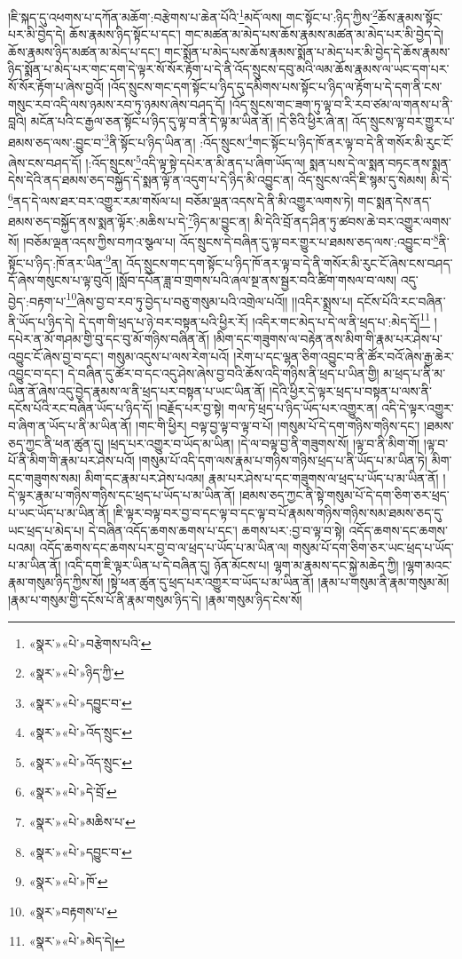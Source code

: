 །ཇི་སྐད་དུ་འཕགས་པ་དཀོན་མཆོག་:བརྩེགས་པ་ཆེན་པོའི་\footnote{«སྣར་»«པེ་»བརྩེགས་པའི་}མདོ་ལས། གང་སྟོང་པ་:ཉིད་ཀྱིས་\footnote{«སྣར་»«པེ་»ཉིད་ཀྱི་}ཆོས་རྣམས་སྟོང་པར་མི་བྱེད་དེ། ཆོས་རྣམས་ཉིད་སྟོང་པ་དང་། གང་མཚན་མ་མེད་པས་ཆོས་རྣམས་མཚན་མ་མེད་པར་མི་བྱེད་དེ། ཆོས་རྣམས་ཉིད་མཚན་མ་མེད་པ་དང་། གང་སྨོན་པ་མེད་པས་ཆོས་རྣམས་སྨོན་པ་མེད་པར་མི་བྱེད་དེ་ཆོས་རྣམས་ཉིད་སྨོན་པ་མེད་པར་གང་དག་དེ་ལྟར་སོ་སོར་རྟོག་པ་དེ་ནི་འོད་སྲུངས་དབུ་མའི་ལམ་ཆོས་རྣམས་ལ་ཡང་དག་པར་སོ་སོར་རྟོག་པ་ཞེས་བྱའོ། །འོད་སྲུངས་གང་དག་སྟོང་པ་ཉིད་དུ་དམིགས་པས་སྟོང་པ་ཉིད་ལ་རྟོག་པ་དེ་དག་ནི་ངས་གསུང་རབ་འདི་ལས་ཉམས་རབ་ཏུ་ཉམས་ཞེས་བཤད་དོ། །འོད་སྲུངས་གང་ཟག་ཏུ་ལྟ་བ་རི་རབ་ཙམ་ལ་གནས་པ་ནི་བླའི། མངོན་པའི་ང་རྒྱལ་ཅན་སྟོང་པ་ཉིད་དུ་ལྟ་བ་ནི་དེ་ལྟ་མ་ཡིན་ནོ། །དེ་ཅིའི་ཕྱིར་ཞེ་ན། འོད་སྲུངས་ལྟ་བར་གྱུར་པ་ཐམས་ཅད་ལས་:བྱུང་བ་\footnote{«སྣར་»«པེ་»དབྱུང་བ་}ནི་སྟོང་པ་ཉིད་ཡིན་ན། :འོད་སྲུངས་\footnote{«སྣར་»«པེ་»འོད་སྲུང་}གང་སྟོང་པ་ཉིད་ཁོ་ནར་ལྟ་བ་དེ་ནི་གསོར་མི་རུང་ངོ་ཞེས་ངས་བཤད་དོ། །:འོད་སྲུངས་\footnote{«སྣར་»«པེ་»འོད་སྲུང་}འདི་ལྟ་སྟེ་དཔེར་ན་མི་ནད་པ་ཞིག་ཡོད་ལ། སྨན་པས་དེ་ལ་སྨན་བཏང་ནས་སྨན་དེས་དེའི་ནད་ཐམས་ཅད་བསྐྱོད་དེ་སྨན་ལྟོ་ན་འདུག་པ་དེ་ཉིད་མི་འབྱུང་ན། འོད་སྲུངས་འདི་ཇི་སྙམ་དུ་སེམས། མི་དེ་\footnote{«སྣར་»«པེ་»དེ་བྲོ་}ནད་དེ་ལས་ཐར་བར་འགྱུར་རམ་གསོལ་པ། བཅོམ་ལྡན་འདས་དེ་ནི་མི་འགྱུར་ལགས་ཏེ། གང་སྨན་དེས་ནད་ཐམས་ཅད་བསྐྱོད་ནས་སྨན་ལྟོར་:མཆིས་པ་དེ་\footnote{«སྣར་»«པེ་»མཆིས་པ་}ཉིད་མ་བྱུང་ན། མི་དེའི་བྲོ་ནད་ཤིན་ཏུ་ཚབས་ཆེ་བར་འགྱུར་ལགས་སོ། །བཅོམ་ལྡན་འདས་ཀྱིས་བཀའ་སྩལ་པ། འོད་སྲུངས་དེ་བཞིན་དུ་ལྟ་བར་གྱུར་པ་ཐམས་ཅད་ལས་:འབྱུང་བ་\footnote{«སྣར་»«པེ་»དབྱུང་བ་}ནི་སྟོང་པ་ཉིད་:ཁོ་ནར་ཡིན་\footnote{«སྣར་»«པེ་»ཁོ་}ན། འོད་སྲུངས་གང་དག་སྟོང་པ་ཉིད་ཁོ་ནར་ལྟ་བ་དེ་ནི་གསོར་མི་རུང་ངོ་ཞེས་ངས་བཤད་དོ་ཞེས་གསུངས་པ་ལྟ་བུའོ། །སློབ་དཔོན་ཟླ་བ་གྲགས་པའི་ཞལ་སྔ་ནས་སྦྱར་བའི་ཚིག་གསལ་བ་ལས། འདུ་བྱེད་:བརྟག་པ་\footnote{«སྣར་»བརྟགས་པ་}ཞེས་བྱ་བ་རབ་ཏུ་བྱེད་པ་བཅུ་གསུམ་པའི་འགྲེལ་པའོ།། །།འདིར་སྨྲས་པ། དངོས་པོའི་རང་བཞིན་ནི་ཡོད་པ་ཉིད་དེ། དེ་དག་གི་ཕྲད་པ་ཉེ་བར་བསྟན་པའི་ཕྱིར་རོ། །འདིར་གང་མེད་པ་དེ་ལ་ནི་ཕྲད་པ་:མེད་དོ།\footnote{«སྣར་»«པེ་»མེད་དེ།} །དཔེར་ན་མོ་གཤམ་གྱི་བུ་དང་བུ་མོ་གཉིས་བཞིན་ནོ། །མིག་དང་གཟུགས་ལ་བརྟེན་ནས་མིག་གི་རྣམ་པར་ཤེས་པ་འབྱུང་ངོ་ཞེས་བྱ་བ་དང་། གསུམ་འདུས་པ་ལས་རེག་པའོ། །རེག་པ་དང་ལྷན་ཅིག་འབྱུང་བ་ནི་ཚོར་བའོ་ཞེས་རྒྱ་ཆེར་འབྱུང་བ་དང་། དེ་བཞིན་དུ་ཚོར་བ་དང་འདུ་ཤེས་ཞེས་བྱ་བའི་ཆོས་འདི་གཉིས་ནི་ཕྲད་པ་ཡིན་གྱི། མ་ཕྲད་པ་ནི་མ་ཡིན་ནོ་ཞེས་འདུ་བྱེད་རྣམས་ལ་ནི་ཕྲད་པར་བསྟན་པ་ཡང་ཡིན་ནོ། །དེའི་ཕྱིར་དེ་ལྟར་ཕྲད་པ་བསྟན་པ་ལས་ནི་དངོས་པོའི་རང་བཞིན་ཡོད་པ་ཉིད་དོ། །བརྗོད་པར་བྱ་སྟེ། གལ་ཏེ་ཕྲད་པ་ཉིད་ཡོད་པར་འགྱུར་ན། འདི་དེ་ལྟར་འགྱུར་བ་ཞིག་ན་ཡོད་པ་ནི་མ་ཡིན་ནོ། །གང་གི་ཕྱིར། བལྟ་བྱ་ལྟ་བ་ལྟ་བ་པོ། །གསུམ་པོ་དེ་དག་གཉིས་གཉིས་དང་། །ཐམས་ཅད་ཀྱང་ནི་ཕན་ཚུན་དུ། །ཕྲད་པར་འགྱུར་བ་ཡོད་མ་ཡིན། །དེ་ལ་བལྟ་བྱ་ནི་གཟུགས་སོ། །ལྟ་བ་ནི་མིག་གོ། །ལྟ་བ་པོ་ནི་མིག་གི་རྣམ་པར་ཤེས་པའོ། །གསུམ་པོ་འདི་དག་ལས་རྣམ་པ་གཉིས་གཉིས་ཕྲད་པ་ནི་ཡོད་པ་མ་ཡིན་ཏེ། མིག་དང་གཟུགས་སམ། མིག་དང་རྣམ་པར་ཤེས་པའམ། རྣམ་པར་ཤེས་པ་དང་གཟུགས་ལ་ཕྲད་པ་ཡོད་པ་མ་ཡིན་ནོ། །དེ་ལྟར་རྣམ་པ་གཉིས་གཉིས་དང་ཕྲད་པ་ཡོད་པ་མ་ཡིན་ནོ། །ཐམས་ཅད་ཀྱང་ནི་སྟེ་གསུམ་པོ་དེ་དག་ཅིག་ཅར་ཕྲད་པ་ཡང་ཡོད་པ་མ་ཡིན་ནོ། །ཇི་ལྟར་བལྟ་བར་བྱ་བ་དང་ལྟ་བ་དང་ལྟ་བ་པོ་རྣམས་གཉིས་གཉིས་སམ་ཐམས་ཅད་དུ་ཡང་ཕྲད་པ་མེད་པ། དེ་བཞིན་འདོད་ཆགས་ཆགས་པ་དང་། ཆགས་པར་:བྱ་བ་ལྟ་བ་སྟེ། འདོད་ཆགས་དང་ཆགས་པའམ། འདོད་ཆགས་དང་ཆགས་པར་བྱ་བ་ལ་ཕྲད་པ་ཡོད་པ་མ་ཡིན་ལ། གསུམ་པོ་དག་ཅིག་ཅར་ཡང་ཕྲད་པ་ཡོད་པ་མ་ཡིན་ནོ། །འདི་དག་ཇི་ལྟར་ཡིན་པ་དེ་བཞིན་དུ། ཉོན་མོངས་པ། ལྷག་མ་རྣམས་དང་སྐྱེ་མཆེད་ཀྱི། །ལྷག་མའང་རྣམ་གསུམ་ཉིད་ཀྱིས་སོ། །སྟེ་ཕན་ཚུན་དུ་ཕྲད་པར་འགྱུར་བ་ཡོད་པ་མ་ཡིན་ནོ། །རྣམ་པ་གསུམ་ནི་རྣམ་གསུམ་མོ། །རྣམ་པ་གསུམ་གྱི་དངོས་པོ་ནི་རྣམ་གསུམ་ཉིད་དེ། །རྣམ་གསུམ་ཉིད་ངེས་སོ། 